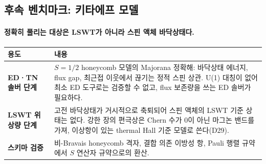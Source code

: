 \subsection{후속 벤치마크: 키타에프 모델}\label{kitaev-benchmark}
\begingroup%
  \framesubtitle{정확히 풀리는 대상은 LSWT가 아니라 스핀 액체 바닥상태다.}
  \begin{tabularx}{\textwidth}{@{}p{2.8cm}Y@{}}
    \toprule
    용도 & 내용 \\
    \midrule
    \textbf{ED·TN 솔버 단계} & $S=1/2$ honeycomb 모델의 Majorana 정확해: 바닥상태 에너지, flux gap,
      최근접 이웃에서 끊기는 정적 스핀 상관. U(1) 대칭이 없어 최소 ED 도구로는 검증할 수 없고,
      flux 보존량을 쓰는 ED 솔버가 필요하다. \\
    \textbf{LSWT 위상량 단계} & 고전 바닥상태가 거시적으로 축퇴되어 스핀 액체의 LSWT 기준 상태는 없다.
      강한 장의 편극상은 Chern 수가 0이 아닌 마그논 밴드를 가져, 이상항이 있는 thermal Hall 기준 모델로 쓴다(D29). \\
    \textbf{스키마 검증} & 비-Bravais honeycomb 격자, 결합 의존 이방성 항, Pauli 행렬 규약에서 $S$ 연산자 규약으로의 환산. \\
    \bottomrule
  \end{tabularx}
  \par\medskip
\endgroup

